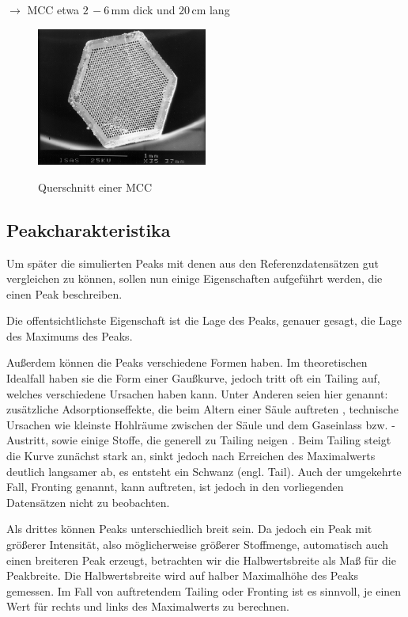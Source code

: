 $\rightarrow$ MCC etwa $2\,-6$\,mm dick und $20$\,cm lang

\begin{figure}
 \centering
  \includegraphics[width = 0.5\textwidth]{bilder/MultiCapillaryColumn}\\
  \caption[Querschnitt einer MCC]{Querschnitt einer MCC \protect\footnotemark}
\end{figure}

\subsection{Peakcharakteristika}
Um später die simulierten Peaks mit denen aus den Referenzdatensätzen gut vergleichen zu können, sollen nun einige Eigenschaften aufgeführt werden, die einen Peak beschreiben.

Die offentsichtlichste Eigenschaft ist die Lage des Peaks, genauer gesagt, die Lage des Maximums des Peaks.

Außerdem können die Peaks verschiedene Formen haben. Im theoretischen Idealfall haben sie die Form einer Gaußkurve, jedoch tritt oft ein Tailing auf, welches verschiedene Ursachen haben kann. Unter Anderen seien hier genannt: zusätzliche Adsorptionseffekte, die beim Altern einer Säule auftreten \cite{kolb2003}, technische Ursachen wie kleinste Hohlräume zwischen der Säule und dem Gaseinlass bzw. -Austritt, sowie einige Stoffe, die generell zu Tailing neigen . 
Beim Tailing steigt die Kurve zunächst stark an, sinkt jedoch nach Erreichen des Maximalwerts deutlich langsamer ab, es entsteht ein Schwanz (engl. Tail). Auch der umgekehrte Fall, Fronting genannt, kann auftreten, ist jedoch in den vorliegenden Datensätzen nicht zu beobachten.

Als drittes können Peaks unterschiedlich breit sein. Da jedoch ein Peak mit größerer Intensität, also möglicherweise größerer Stoffmenge, automatisch auch einen breiteren Peak erzeugt, betrachten wir die Halbwertsbreite als Maß für die Peakbreite. Die Halbwertsbreite wird auf halber Maximalhöhe des Peaks gemessen. Im Fall von auftretendem Tailing oder Fronting ist es sinnvoll, je einen Wert für rechts und links des Maximalwerts zu berechnen.


